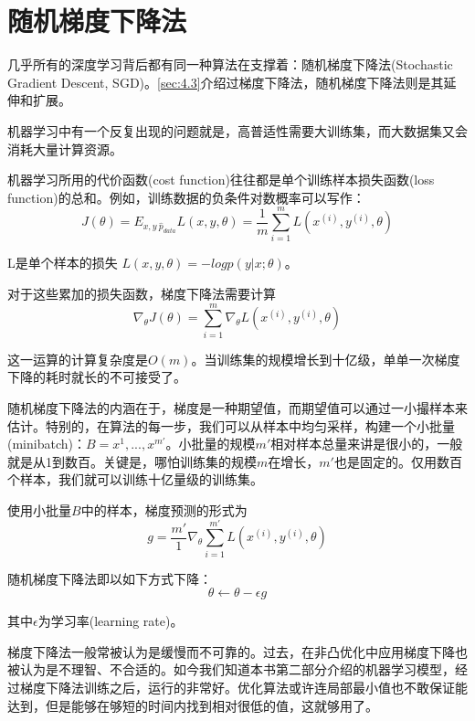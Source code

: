 \section{随机梯度下降法}
\label{sec:5.9}

几乎所有的深度学习背后都有同一种算法在支撑着：随机梯度下降法(Stochastic Gradient Descent, SGD)。\ref{sec:4.3}介绍过梯度下降法，随机梯度下降法则是其延伸和扩展。

机器学习中有一个反复出现的问题就是，高普适性需要大训练集，而大数据集又会消耗大量计算资源。

机器学习所用的代价函数(cost function)往往都是单个训练样本损失函数(loss function)的总和。例如，训练数据的负条件对数概率可以写作：
\begin{equation}
	J(\theta) = E_{x,y~\hat{p}_{data}}L(x,y,\theta) = \frac{1}{m}\sum_{i=1}^m L(x^{(i)},y^{(i)},\theta)
   \label{form:5.88}
\end{equation}

L是单个样本的损失 $L(x,y,\theta) = -log p(y|x;\theta)$。

对于这些累加的损失函数，梯度下降法需要计算
\begin{equation}
	\nabla_{\theta}J(\theta) = \sum_{i=1}^m \nabla_{\theta}L(x^{(i)},y^{(i)},\theta)
   	\label{form:5.89}
\end{equation}

这一运算的计算复杂度是$O(m)$。当训练集的规模增长到十亿级，单单一次梯度下降的耗时就长的不可接受了。

随机梯度下降法的内涵在于，梯度是一种期望值，而期望值可以通过一小撮样本来估计。特别的，在算法的每一步，我们可以从样本中均匀采样，构建一个小批量(minibatch)：$B={x^{1},...,x^{m'}}$。小批量的规模$m'$相对样本总量来讲是很小的，一般就是从1到数百。关键是，哪怕训练集的规模$m$在增长，$m'$也是固定的。仅用数百个样本，我们就可以训练十亿量级的训练集。

使用小批量$B$中的样本，梯度预测的形式为
\begin{equation}
	g = \frac{m'}{1} \nabla_{\theta} \sum_{i=1}^{m'} L(x^{(i)}, y^{(i)}, \theta)
   	\label{form:5.90}
\end{equation}

随机梯度下降法即以如下方式下降：
\begin{equation}
	\theta \leftarrow \theta - \epsilon g
    \label{form:5.91}
\end{equation}

其中$\epsilon$为学习率(learning rate)。

梯度下降法一般常被认为是缓慢而不可靠的。过去，在非凸优化中应用梯度下降也被认为是不理智、不合适的。如今我们知道本书第二部分介绍的机器学习模型，经过梯度下降法训练之后，运行的非常好。优化算法或许连局部最小值也不敢保证能达到，但是能够在够短的时间内找到相对很低的值，这就够用了。

